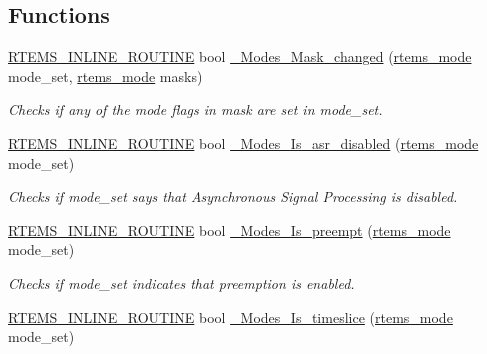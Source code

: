 \subsection*{Functions}
\begin{DoxyCompactItemize}
\item 
\mbox{\hyperlink{group__RTEMSScoreBaseDefs_gac216239df231d5dbd15e3520b0b9313f}{R\+T\+E\+M\+S\+\_\+\+I\+N\+L\+I\+N\+E\+\_\+\+R\+O\+U\+T\+I\+NE}} bool \mbox{\hyperlink{group__ClassicModesImpl_ga08ded713046ba96e23768bd60beb334e}{\+\_\+\+Modes\+\_\+\+Mask\+\_\+changed}} (\mbox{\hyperlink{group__ClassicModes_ga8d46a41a837840dc97336fdcd20e4f68}{rtems\+\_\+mode}} mode\+\_\+set, \mbox{\hyperlink{group__ClassicModes_ga8d46a41a837840dc97336fdcd20e4f68}{rtems\+\_\+mode}} masks)
\begin{DoxyCompactList}\small\item\em Checks if any of the mode flags in mask are set in mode\+\_\+set. \end{DoxyCompactList}\item 
\mbox{\hyperlink{group__RTEMSScoreBaseDefs_gac216239df231d5dbd15e3520b0b9313f}{R\+T\+E\+M\+S\+\_\+\+I\+N\+L\+I\+N\+E\+\_\+\+R\+O\+U\+T\+I\+NE}} bool \mbox{\hyperlink{group__ClassicModesImpl_ga34e4751d5be175830dae1780aa09776e}{\+\_\+\+Modes\+\_\+\+Is\+\_\+asr\+\_\+disabled}} (\mbox{\hyperlink{group__ClassicModes_ga8d46a41a837840dc97336fdcd20e4f68}{rtems\+\_\+mode}} mode\+\_\+set)
\begin{DoxyCompactList}\small\item\em Checks if mode\+\_\+set says that Asynchronous Signal Processing is disabled. \end{DoxyCompactList}\item 
\mbox{\hyperlink{group__RTEMSScoreBaseDefs_gac216239df231d5dbd15e3520b0b9313f}{R\+T\+E\+M\+S\+\_\+\+I\+N\+L\+I\+N\+E\+\_\+\+R\+O\+U\+T\+I\+NE}} bool \mbox{\hyperlink{group__ClassicModesImpl_ga7951761df7339bfa621b3c1bee188d15}{\+\_\+\+Modes\+\_\+\+Is\+\_\+preempt}} (\mbox{\hyperlink{group__ClassicModes_ga8d46a41a837840dc97336fdcd20e4f68}{rtems\+\_\+mode}} mode\+\_\+set)
\begin{DoxyCompactList}\small\item\em Checks if mode\+\_\+set indicates that preemption is enabled. \end{DoxyCompactList}\item 
\mbox{\hyperlink{group__RTEMSScoreBaseDefs_gac216239df231d5dbd15e3520b0b9313f}{R\+T\+E\+M\+S\+\_\+\+I\+N\+L\+I\+N\+E\+\_\+\+R\+O\+U\+T\+I\+NE}} bool \mbox{\hyperlink{group__ClassicModesImpl_ga38bf25bb20c0d19b57cf50c8d7af339c}{\+\_\+\+Modes\+\_\+\+Is\+\_\+timeslice}} (\mbox{\hyperlink{group__ClassicModes_ga8d46a41a837840dc97336fdcd20e4f68}{rtems\+\_\+mode}} mode\+\_\+set)

\end{DoxyCompactItemize}
